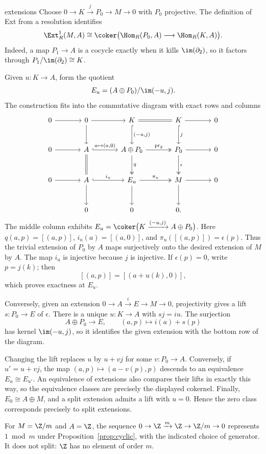 \documentclass[11pt]{article}
\begin{document}
\begin{linkedproof}{extensions}
Choose $0\to K\xrightarrow{j}P_0\to M\to0$ with $P_0$ projective. The definition of Ext from a resolution identifies
\[
\Ext_R^1(M,A)\cong
\coker\bigl(\Hom_R(P_0,A)\longrightarrow\Hom_R(K,A)\bigr).
\]
Indeed, a map $P_1\to A$ is a cocycle exactly when it kills $\im(\partial_2)$, so it factors through $P_1/\im(\partial_2)\cong K$.

Given $u:K\to A$, form the quotient
\[
E_u=(A\oplus P_0)/\im(-u,j).
\]
The construction fits into the commutative diagram with exact rows and columns
\[
\begin{tikzcd}[column sep=large,row sep=large]
0 \arrow[r] & 0 \arrow[r] \arrow[d]
& K \arrow[r,equal] \arrow[d,hook,"{(-u,j)}"]
& K \arrow[r] \arrow[d,hook,"j"] & 0\\
0 \arrow[r] & A \arrow[r,hook,"{a\mapsto(a,0)}"] \arrow[d,equal]
& A\oplus P_0 \arrow[r,two heads,"\mathrm{pr}_2"] \arrow[d,two heads,"q"]
& P_0 \arrow[r] \arrow[d,two heads,"\epsilon"] & 0\\
0 \arrow[r] & A \arrow[r,hook,"i_u"] \arrow[d]
& E_u \arrow[r,two heads,"\pi_u"] \arrow[d]
& M \arrow[r] \arrow[d] & 0\\
& 0 & 0 & 0.
\end{tikzcd}
\]
The middle column exhibits $E_u=\coker\bigl(K\xrightarrow{(-u,j)}A\oplus P_0\bigr)$. Here $q(a,p)=[(a,p)]$, $i_u(a)=[(a,0)]$, and $\pi_u([(a,p)])=\epsilon(p)$. Thus the trivial extension of $P_0$ by $A$ maps surjectively onto the desired extension of $M$ by $A$. The map $i_u$ is injective because $j$ is injective. If $\epsilon(p)=0$, write $p=j(k)$; then
\[
[(a,p)]=[(a+u(k),0)],
\]
which proves exactness at $E_u$.

Conversely, given an extension $0\to A\xrightarrow{i}E\to M\to0$, projectivity gives a lift $s:P_0\to E$ of $\epsilon$. There is a unique $u:K\to A$ with $sj=iu$. The surjection
\[
A\oplus P_0\longrightarrow E,\qquad (a,p)\longmapsto i(a)+s(p)
\]
has kernel $\im(-u,j)$, so it identifies the given extension with the bottom row of the diagram.

Changing the lift replaces $u$ by $u+vj$ for some $v:P_0\to A$. Conversely, if $u'=u+vj$, the map $(a,p)\mapsto(a-v(p),p)$ descends to an equivalence $E_u\cong E_{u'}$. An equivalence of extensions also compares their lifts in exactly this way, so the equivalence classes are precisely the displayed cokernel. Finally, $E_0\cong A\oplus M$, and a split extension admits a lift with $u=0$. Hence the zero class corresponds precisely to split extensions.
\end{linkedproof}
For $M=\Z/m$ and $A=\Z$, the sequence $0\to\Z\xrightarrow{m}\Z\to\Z/m\to0$ represents $1\bmod m$ under Proposition~\ref{prop:cyclic}, with the indicated choice of generator. It does not split: $\Z$ has no element of order $m$.
\end{document}
